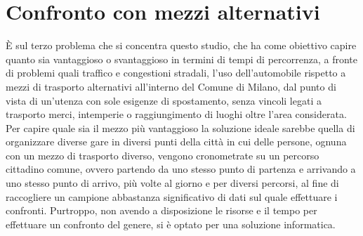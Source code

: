 \section{Confronto con mezzi alternativi}

È sul terzo problema che si concentra questo studio, che ha come obiettivo capire quanto sia vantaggioso o svantaggioso in termini di tempi di percorrenza, a fronte di problemi quali traffico e congestioni stradali, l'uso dell'automobile rispetto a mezzi di trasporto alternativi all'interno del Comune di Milano, dal punto di vista di un'utenza con sole esigenze di spostamento, senza vincoli legati a trasporto merci, intemperie o raggiungimento di luoghi oltre l'area considerata. Per capire quale sia il mezzo più vantaggioso la soluzione ideale sarebbe quella di organizzare diverse gare in diversi punti della città in cui delle persone, ognuna con un mezzo di trasporto diverso, vengono cronometrate su un percorso cittadino comune, ovvero partendo da uno stesso punto di partenza e arrivando a uno stesso punto di arrivo, più volte al giorno e per diversi percorsi, al fine di raccogliere un campione abbastanza significativo di dati sul quale effettuare i confronti. Purtroppo, non avendo a disposizione le risorse e il tempo per effettuare un confronto del genere, si è optato per una soluzione informatica.